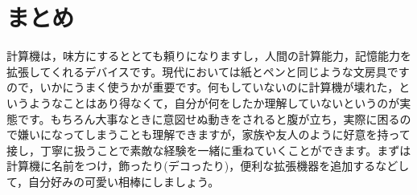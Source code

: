\documentclass{ltjsbook}
\begin{document}
\section{まとめ}

計算機は，味方にするととても頼りになりますし，人間の計算能力，記憶能力を拡張してくれるデバイスです。現代においては紙とペンと同じような文房具ですので，いかにうまく使うかが重要です。何もしていないのに計算機が壊れた，というようなことはあり得なくて，自分が何をしたか理解していないというのが実態です。もちろん大事なときに意図せぬ動きをされると腹が立ち，実際に困るので嫌いになってしまうことも理解できますが，家族や友人のように好意を持って接し，丁寧に扱うことで素敵な経験を一緒に重ねていくことができます。まずは計算機に名前をつけ，飾ったり(デコったり)，便利な拡張機器を追加するなどして，自分好みの可愛い相棒にしましょう。
\end{document}
